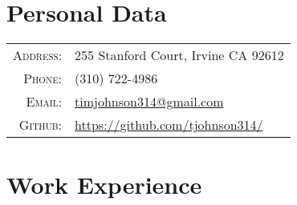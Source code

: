 \documentclass[a4paper,10pt]{article} %
\begin{document}
\pagestyle{empty} %

\par{\par} %

\section{Personal Data}

\begin{tabular}{rl}
\textsc{Address:} & 255 Stanford Court, Irvine CA 92612\\
\textsc{Phone:} & (310) 722-4986\\
\textsc{Email:} & \href{mailto:timjohnson314@gmail.com}{timjohnson314@gmail.com} \\
\textsc{Github:} & \href{https://github.com/tjohnson314/}{https://github.com/tjohnson314/}
\end{tabular}


\section{Work Experience}
\end{document}
